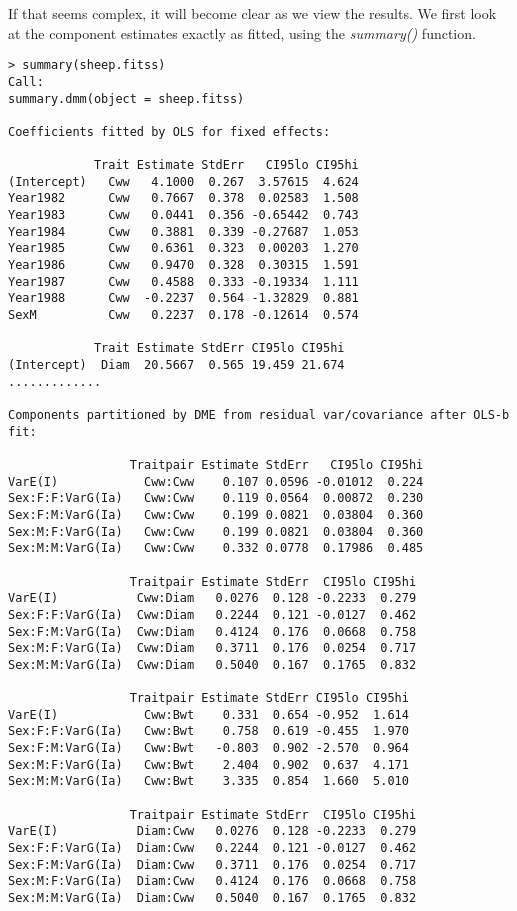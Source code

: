 \documentclass[titlepage]{article}  %
\begin{document}
If that seems complex, it will become clear as we view the results. We first look at the component estimates exactly as fitted, using the {\em summary()} function.
\begin{verbatim}
> summary(sheep.fitss)
Call:
summary.dmm(object = sheep.fitss)

Coefficients fitted by OLS for fixed effects:

            Trait Estimate StdErr   CI95lo CI95hi
(Intercept)   Cww   4.1000  0.267  3.57615  4.624
Year1982      Cww   0.7667  0.378  0.02583  1.508
Year1983      Cww   0.0441  0.356 -0.65442  0.743
Year1984      Cww   0.3881  0.339 -0.27687  1.053
Year1985      Cww   0.6361  0.323  0.00203  1.270
Year1986      Cww   0.9470  0.328  0.30315  1.591
Year1987      Cww   0.4588  0.333 -0.19334  1.111
Year1988      Cww  -0.2237  0.564 -1.32829  0.881
SexM          Cww   0.2237  0.178 -0.12614  0.574

            Trait Estimate StdErr CI95lo CI95hi
(Intercept)  Diam  20.5667  0.565 19.459 21.674
.............

Components partitioned by DME from residual var/covariance after OLS-b fit:

                 Traitpair Estimate StdErr   CI95lo CI95hi
VarE(I)            Cww:Cww    0.107 0.0596 -0.01012  0.224
Sex:F:F:VarG(Ia)   Cww:Cww    0.119 0.0564  0.00872  0.230
Sex:F:M:VarG(Ia)   Cww:Cww    0.199 0.0821  0.03804  0.360
Sex:M:F:VarG(Ia)   Cww:Cww    0.199 0.0821  0.03804  0.360
Sex:M:M:VarG(Ia)   Cww:Cww    0.332 0.0778  0.17986  0.485

                 Traitpair Estimate StdErr  CI95lo CI95hi
VarE(I)           Cww:Diam   0.0276  0.128 -0.2233  0.279
Sex:F:F:VarG(Ia)  Cww:Diam   0.2244  0.121 -0.0127  0.462
Sex:F:M:VarG(Ia)  Cww:Diam   0.4124  0.176  0.0668  0.758
Sex:M:F:VarG(Ia)  Cww:Diam   0.3711  0.176  0.0254  0.717
Sex:M:M:VarG(Ia)  Cww:Diam   0.5040  0.167  0.1765  0.832

                 Traitpair Estimate StdErr CI95lo CI95hi
VarE(I)            Cww:Bwt    0.331  0.654 -0.952  1.614
Sex:F:F:VarG(Ia)   Cww:Bwt    0.758  0.619 -0.455  1.970
Sex:F:M:VarG(Ia)   Cww:Bwt   -0.803  0.902 -2.570  0.964
Sex:M:F:VarG(Ia)   Cww:Bwt    2.404  0.902  0.637  4.171
Sex:M:M:VarG(Ia)   Cww:Bwt    3.335  0.854  1.660  5.010

                 Traitpair Estimate StdErr  CI95lo CI95hi
VarE(I)           Diam:Cww   0.0276  0.128 -0.2233  0.279
Sex:F:F:VarG(Ia)  Diam:Cww   0.2244  0.121 -0.0127  0.462
Sex:F:M:VarG(Ia)  Diam:Cww   0.3711  0.176  0.0254  0.717
Sex:M:F:VarG(Ia)  Diam:Cww   0.4124  0.176  0.0668  0.758
Sex:M:M:VarG(Ia)  Diam:Cww   0.5040  0.167  0.1765  0.832


\end{verbatim}
\end{document}
